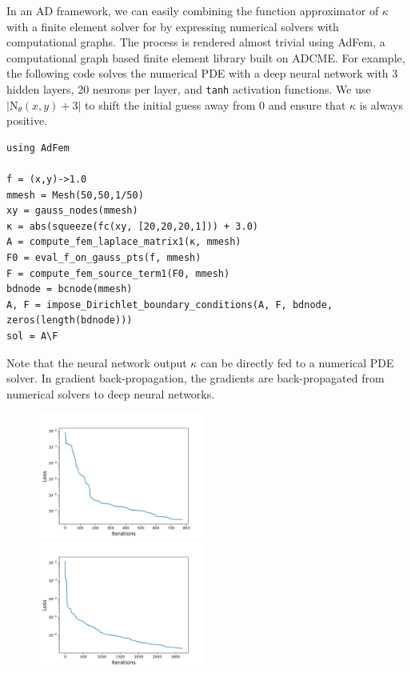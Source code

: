 \documentclass[3p,preprint,12pt]{elsarticle}
\begin{document}
In an AD framework, we can easily combining the function approximator of $\kappa$ with a finite element solver for  by expressing numerical solvers with computational graphs. The process is rendered almost trivial using AdFem, a computational graph based finite element library built on ADCME. For example, the following code solves the numerical PDE with a deep neural network with 3 hidden layers, 20 neurons per layer, and \texttt{tanh} activation functions. We use $|\text{N}_\theta(x, y) + 3|$ to shift the initial guess away from 0 and ensure that $\kappa$ is always positive. 
\begin{verbatim}
using AdFem

f = (x,y)->1.0
mmesh = Mesh(50,50,1/50)
xy = gauss_nodes(mmesh)
κ = abs(squeeze(fc(xy, [20,20,20,1])) + 3.0)
A = compute_fem_laplace_matrix1(κ, mmesh)
F0 = eval_f_on_gauss_pts(f, mmesh)
F = compute_fem_source_term1(F0, mmesh)
bdnode = bcnode(mmesh)
A, F = impose_Dirichlet_boundary_conditions(A, F, bdnode, zeros(length(bdnode)))
sol = A\F 
\end{verbatim}
Note that the neural network output $\kappa$ can be directly fed to a numerical PDE solver. In gradient back-propagation, the gradients are back-propagated from numerical solvers to deep neural networks. 

\begin{figure}[htpb]
    \centering
    \includegraphics[width=0.49\textwidth]{paper/Kailai/figures/combine_loss.png}~
    \includegraphics[width=0.49\textwidth]{paper/Kailai/figures/combine_loss_rbf.png}
    \caption{}
    \label{fig:closs_nn}
\end{figure}
\end{document}
